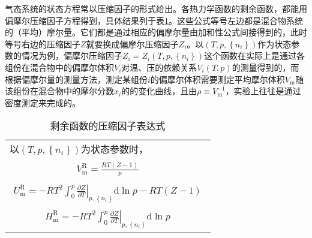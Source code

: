 \documentclass[main.tex]{subfiles}
\begin{document}
气态系统的状态方程常以压缩因子的形式给出。各热力学函数的剩余函数，都能用偏摩尔压缩因子方程得到，具体结果列于表\ref{tab:residule_functions_compressibility_factor}。这些公式等号左边都是混合物系统的（平均）摩尔量。它们都是通过相应的偏摩尔量由加和性公式间接得到的，此时等号右边的压缩因子$Z$就要换成偏摩尔压缩因子$Z_i$。以$\left(T,p,\left\{n_i\right\}\right)$作为状态参数的情况为例，偏摩尔压缩因子$Z_i=Z_i\left(T,p,\left\{n_i\right\}\right)$这个函数在实际上是通过各组份在混合物中的偏摩尔体积$V_i$对温、压的依赖关系$V_i\left(T,p\right)$的测量得到的，而根据偏摩尔量的测量方法，测定某组份$i$的偏摩尔体积需要测定平均摩尔体积$V_\text{m}$随该组份在混合物中的摩尔分数$x_i$的的变化曲线，且由$\rho\equiv V^{-1}_\text{m}$，实验上往往是通过密度测定来完成的。
\begin{longtable}{m{}}
  \caption{剩余函数的压缩因子表达式}                                   \label{tab:residule_functions_compressibility_factor}                                                                                                                                                  \\
  \hline
  以$\left(T,p,\left\{n_i\right\}\right)$为状态参数时，                                                                                                                                                                                                                   \\[-4ex]
  \begin{align}
    V_\text{m}^\text{R}=\frac{RT\left(Z-1\right)}{p}
  \end{align}                                                                                                                                                                                                                 \\[-8ex]
  \begin{align}
    U_\text{m}^\text{R}=-RT^2\int_0^p\left.\frac{\partial Z}{\partial T}\right|_{p,\left\{n_i\right\}}\mathrm{d}\ln p-RT\left(Z-1\right)
  \end{align}                                                                                                                             \\[-8ex]
  \begin{align}H_\text{m}^\text{R}=-RT^2\int_0^p\left.\frac{\partial Z}{\partial T}\right|_{p,\left\{n_i\right\}}\mathrm{d}\ln p\end{align}                                                                                                                       \\[-8ex]

\end{longtable}
\end{document}
